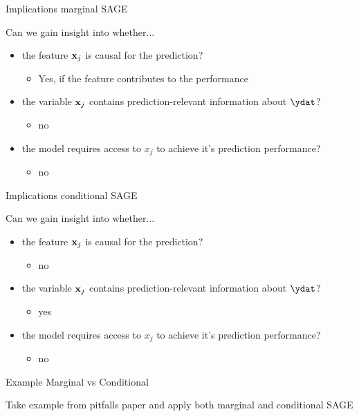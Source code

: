 \documentclass[11pt,compress,t,notes=noshow, xcolor=table]{beamer}
\begin{document}
\begin{vbframe}{Implications marginal SAGE}

Can we gain insight into whether...

\begin{itemize}
    \item the feature $\xj$ is causal for the prediction?
    \begin{itemize}
      \item Yes, if the feature contributes to the performance
    \end{itemize}
    \item the variable $\xj$ contains prediction-relevant information about $\ydat$?
    \begin{itemize}
      \item no
    \end{itemize}
    \item the model requires access to $x_j$ to achieve it's prediction performance?  
    \begin{itemize}
        \item no
    \end{itemize}
\end{itemize}

\end{vbframe}

\begin{vbframe}{Implications conditional SAGE}

Can we gain insight into whether...

\begin{itemize}
    \item the feature $\xj$ is causal for the prediction?
    \begin{itemize}
      \item no
    \end{itemize}
    \item the variable $\xj$ contains prediction-relevant information about $\ydat$?
    \begin{itemize}
      \item yes
    \end{itemize}
    \item the model requires access to $x_j$ to achieve it's prediction performance?  
    \begin{itemize}
        \item no
    \end{itemize}
\end{itemize}

\end{vbframe}

\begin{vbframe}{Example Marginal vs Conditional}

Take example from pitfalls paper and apply both marginal and conditional SAGE
  
\end{vbframe}


\begin{vbframe}
  \printbibliography
\end{vbframe}

\endlecture
\end{document}
